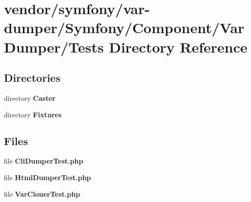 \section{vendor/symfony/var-\/dumper/\+Symfony/\+Component/\+Var\+Dumper/\+Tests Directory Reference}
\label{dir_c3e0a7f9c70d3eb2694fb267967bdb98}
\subsection*{Directories}
\begin{DoxyCompactItemize}
\item 
directory {\bf Caster}
\item 
directory {\bf Fixtures}
\end{DoxyCompactItemize}
\subsection*{Files}
\begin{DoxyCompactItemize}
\item 
file {\bf Cli\+Dumper\+Test.\+php}
\item 
file {\bf Html\+Dumper\+Test.\+php}
\item 
file {\bf Var\+Cloner\+Test.\+php}
\end{DoxyCompactItemize}

